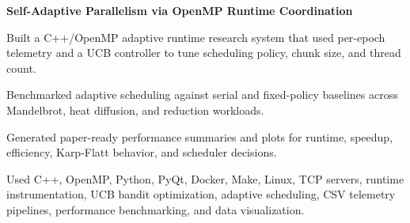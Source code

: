 \documentclass[letterpaper,10pt]{article}
\newcommand{\projectHeading}[2]{
  \vspace{2pt}
  \textbf{#1} \hfill #2
}
\begin{document}
\projectHeading{Self-Adaptive Parallelism via OpenMP Runtime Coordination}{}
\begin{tightitemize}
  \item Built a C++/OpenMP adaptive runtime research system that used per-epoch telemetry and a UCB controller to tune scheduling policy, chunk size, and thread count.
  \item Benchmarked adaptive scheduling against serial and fixed-policy baselines across Mandelbrot, heat diffusion, and reduction workloads.
  \item Generated paper-ready performance summaries and plots for runtime, speedup, efficiency, Karp-Flatt behavior, and scheduler decisions.
  \item Used C++, OpenMP, Python, PyQt, Docker, Make, Linux, TCP servers, runtime instrumentation, UCB bandit optimization, adaptive scheduling, CSV telemetry pipelines, performance benchmarking, and data visualization.
\end{tightitemize}
\end{document}
